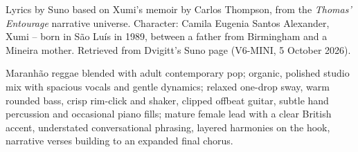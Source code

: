 
\begin{notes}
Lyrics by Suno based on Xumi's memoir by Carlos Thompson, from the \emph{Thomas’ Entourage} narrative universe. Character: Camila Eugenia Santos Alexander, Xumi -- born in São Luís in 1989, between a father from Birmingham and a Mineira mother. Retrieved from Dvigitt's Suno page (V6-MINI, 5 October 2026).
\end{notes}
\begin{style}
Maranhão reggae blended with adult contemporary pop; organic, polished studio mix with spacious vocals and gentle dynamics; relaxed one-drop sway, warm rounded bass, crisp rim-click and shaker, clipped offbeat guitar, subtle hand percussion and occasional piano fills; mature female lead with a clear British accent, understated conversational phrasing, layered harmonies on the hook, narrative verses building to an expanded final chorus.
\end{style}
